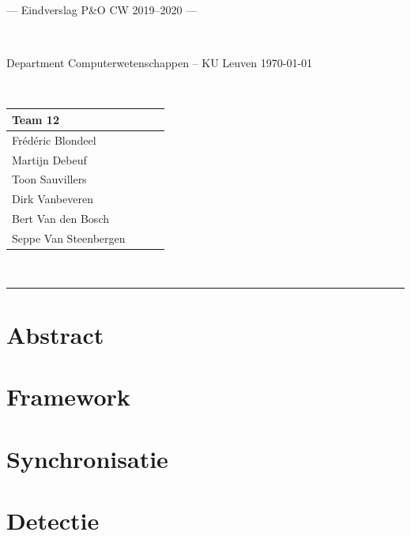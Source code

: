 \documentclass[a4paper,11pt]{article}
\begin{document}
\newcommand{\note}[1]{{\colorbox{yellow!40!white}{#1}}}
\newcommand{\exampletext}[1]{{\color{blue!60!black}#1}}

\noindent
\colorbox[HTML]{52BDEC}{\bfseries\parbox{\textwidth}{\centering\large
--- Eindverslag P\&O CW 2019--2020 ---
}}
\\[-1mm]
\colorbox[HTML]{00407A}{\bfseries\color{white}\parbox{\textwidth}{
Department Computerwetenschappen -- KU Leuven
\hfill
\today
}}
\\

\smallskip

\noindent

\begin{tabular}{*4l}
\toprule
\multicolumn{2}{l}{\large\textbf{Team 12}} \\
\midrule
Frédéric Blondeel &\\
Martijn Debeuf &\\
Toon Sauvillers &\\ %
Dirk Vanbeveren  &\\
Bert Van den Bosch & \\
Seppe Van Steenbergen &\\


\bottomrule
\hline
\end{tabular}\\
\smallskip

\noindent
{\color[HTML]{52BDEC} \rule{\linewidth}{1mm} }


\section*{Abstract}\label{sec:abstract}

\newpage

\tableofcontents
\newpage



\section{Framework}\label{sec:framework}


\section{Synchronisatie}\label{sec:synchronisatie}




\section{Detectie}\label{sec:detectie}

\end{document}
